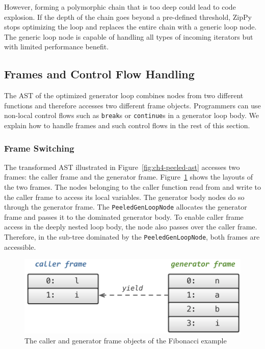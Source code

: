 However, forming a polymorphic chain that is too deep could lead to code explosion.
If the depth of the chain goes beyond a pre-defined threshold, ZipPy stops optimizing the loop and replaces the entire chain with a generic loop node.
The generic loop node is capable of handling all types of incoming iterators but with limited performance benefit.

\subsection{Frames and Control Flow Handling}
\label{sec:ch4-frame_and_control}

The AST of the optimized generator loop combines nodes from two different functions and therefore accesses two different frame objects.
Programmers can use non-local control flows such as \texttt{break}s or \texttt{continue}s in a generator loop body.
We explain how to handle frames and such control flows in the rest of this section.

\subsubsection*{Frame Switching}

The transformed AST illustrated in Figure~\ref{fig:ch4-peeled-ast} accesses two frames: the caller frame and the generator frame.
Figure~\ref{fig:ch4-two-frames} shows the layouts of the two frames.
The nodes belonging to the caller function read from and write to the caller frame to access its local variables.
The generator body nodes do so through the generator frame.
The \texttt{PeeledGenLoopNode} allocates the generator frame and passes it to the dominated generator body.
To enable caller frame access in the deeply nested loop body, the node also passes over the caller frame.
Therefore, in the sub-tree dominated by the \texttt{PeeledGenLoopNode}, both frames are accessible.

\begin{figure}[!ht]
\centering
\includegraphics[scale=1.2]{figures/ch4-two-frames}
\caption{The caller and generator frame objects of the Fibonacci example}
\label{fig:ch4-two-frames}
\end{figure}

